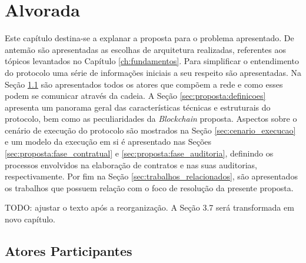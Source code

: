 \chapter{Alvorada}
\label{ch:proposta}

Este capítulo destina-se a explanar a proposta para o problema apresentado. De antemão são apresentadas as escolhas de arquitetura realizadas, referentes aos tópicos levantados no Capítulo \ref{ch:fundamentos}. Para simplificar o entendimento do protocolo uma série de informações iniciais a seu respeito são apresentadas. Na Seção \ref{sec:proposta:atores} são apresentados todos os atores que compõem a rede e como esses podem se comunicar através da cadeia. A Seção \ref{sec:proposta:definicoes} apresenta um panorama geral das características técnicas e estruturais do protocolo, bem como as peculiaridades da \textit{Blockchain} proposta. Aspectos sobre o cenário de execução do protocolo são mostrados na Seção \ref{sec:cenario_execucao} e um modelo da execução em si é apresentado nas Seções \ref{sec:proposta:fase_contratual} e \ref{sec:proposta:fase_auditoria}, definindo os processos envolvidos na elaboração de contratos e nas suas auditorias, respectivamente. Por fim na Seção \ref{sec:trabalhos_relacionados}, são apresentados os trabalhos que possuem relação com o foco de resolução da presente proposta.


TODO: ajustar o texto após a reorganização. A Seção 3.7 será transformada em novo capítulo.


%
\section{Atores Participantes}
\label{sec:proposta:atores}

